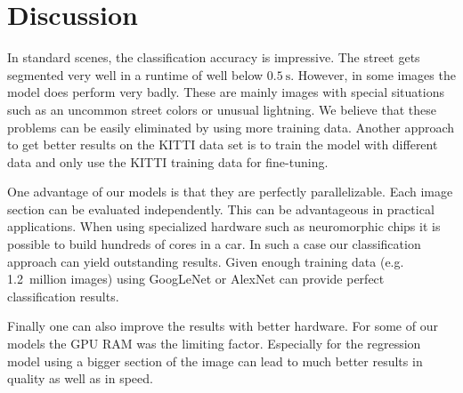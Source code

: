 
\section{Discussion}\label{sec:discussion}

In standard scenes, the classification accuracy is impressive. The street gets
segmented very well in a runtime of well below  $\SI{0.5}{\second}$. However,
in some images the model does perform very badly. These are mainly images with
special situations such as an uncommon street colors or unusual lightning. We
believe that these problems can be easily eliminated by using more training
data. Another approach to get better results on the KITTI data set is to train
the model with different data and only use the KITTI training data for
fine-tuning.

One advantage of our models is that they are perfectly parallelizable. Each
image section can be evaluated independently. This can be advantageous in
practical applications. When using specialized hardware such as neuromorphic
chips it is possible to build hundreds of cores in a car. In such a case our
classification approach can yield outstanding results. Given enough training
data (e.g. 1.2~million images) using GoogLeNet or AlexNet can provide perfect
classification results.

Finally one can also improve the results with better hardware. For some of our
models the \gls{GPU} RAM was the limiting factor. Especially for the regression
model using a bigger section of the image can lead to much better results in
quality as well as in speed.
